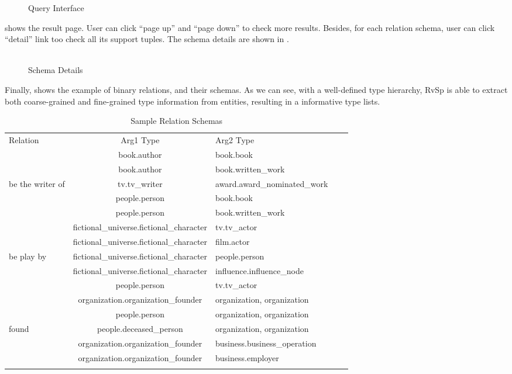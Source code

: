 \begin{figure}[ht]
\centering
{}
\caption{Query Interface}
\label{fig:demo1}
\end{figure}


 shows the result page.
User can click ``page up'' and ``page down'' to check more results.
Besides, for each relation schema, user can click ``detail'' link too check all its support tuples.
The schema details are shown in .
\\
\\

\begin{figure}[ht]
\centering
{}
\caption{Schema Details}
\label{fig:demo2}
\end{figure}

Finally,  shows the example of binary relations, and their schemas.
As we can see, with a well-defined type hierarchy, RvSp is able to extract both coarse-grained and fine-grained type information from entities, resulting in a informative type lists.

\begin{table*}[htbp]
	\centering
	\caption{Sample Relation Schemas}
	\begin{tabular}{Ic|l|lI}
        \whline
		Relation & Arg1 Type & Arg2 Type \\
        \whline
        & book.author & book.book \\
        & book.author & book.written\_work \\
        be the writer of & tv.tv\_writer & award.award\_nominated\_work \\
        & people.person & book.book \\
        & people.person & book.written\_work  \\
        \hline
        & fictional\_universe.fictional\_character & tv.tv\_actor  \\
        & fictional\_universe.fictional\_character & film.actor  \\
        be play by & fictional\_universe.fictional\_character & people.person  \\
        & fictional\_universe.fictional\_character & influence.influence\_node  \\
        & people.person & tv.tv\_actor  \\
        \hline
        & organization.organization\_founder & organization, organization \\
        & people.person & organization, organization \\
        found & people.deceased\_person & organization, organization \\
        & organization.organization\_founder & business.business\_operation \\
        & organization.organization\_founder & business.employer \\
        \whline
	\end{tabular}%
	\label{tab:sample_relation}%
\end{table*} 